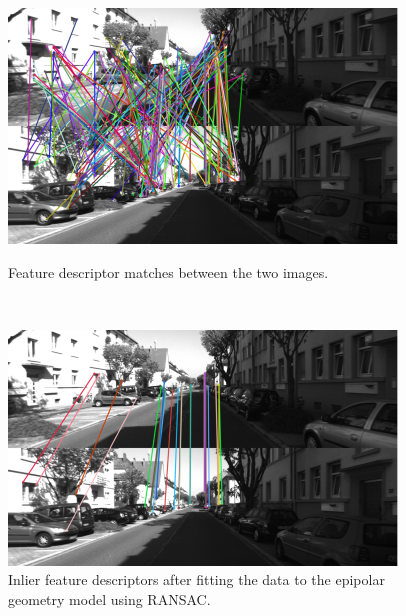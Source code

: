 \begin{figure}[h]
    \centering
    \captionsetup{format=plain}
    \begin{minipage}[t]{0.475\textwidth}
        \centering
        \includegraphics[width=\textwidth]{figures/vo_matches.pdf}
        \caption{Feature descriptor matches between the two images.}
        \label{fig:vo-matches}
    \end{minipage}\hfill%
    ~
    \begin{minipage}[t]{0.475\textwidth}
        \centering
        \includegraphics[width=\textwidth]{figures/vo_matches_ransac.pdf}
        \caption{Inlier feature descriptors after fitting the data to the epipolar geometry model using RANSAC.}
        \label{fig:vo-matches-ransac}
    \end{minipage}%
\end{figure}

